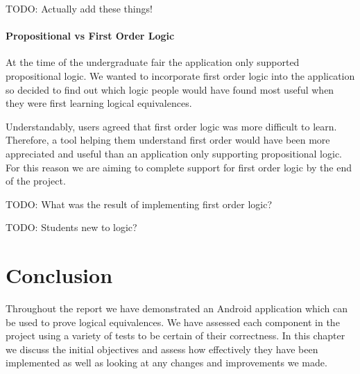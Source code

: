 \documentclass{report}
\begin{document}

TODO: Actually add these things!

\subsubsection{Propositional vs First Order Logic}

At the time of the undergraduate fair the application only supported propositional logic. We wanted to incorporate first order logic into the application so decided to find out which logic people would have found most useful when they were first learning logical equivalences.

Understandably, users agreed that first order logic was more difficult to learn. Therefore, a tool helping them understand first order would have been more appreciated and useful than an application only supporting propositional logic. For this reason we are aiming to complete support for first order logic by the end of the project.

TODO: What was the result of implementing first order logic?

TODO: Students new to logic?



\chapter{Conclusion}

Throughout the report we have demonstrated an Android application which can be used to prove logical equivalences. We have assessed each component in the project using a variety of tests to be certain of their correctness. In this chapter we discuss the initial objectives and assess how effectively they have been implemented as well as looking at any changes and improvements we made.
\end{document}
